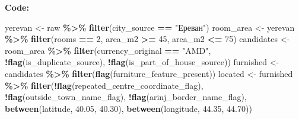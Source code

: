 \documentclass[
]{article}
\newenvironment{Shaded}{\begin{snugshade}}{\end{snugshade}}
\newcommand{\DecValTok}[1]{\textcolor[rgb]{0.00,0.00,0.81}{#1}}
\newcommand{\FloatTok}[1]{\textcolor[rgb]{0.00,0.00,0.81}{#1}}
\newcommand{\FunctionTok}[1]{\textcolor[rgb]{0.13,0.29,0.53}{\textbf{#1}}}
\newcommand{\NormalTok}[1]{#1}
\newcommand{\OtherTok}[1]{\textcolor[rgb]{0.56,0.35,0.01}{#1}}
\newcommand{\SpecialCharTok}[1]{\textcolor[rgb]{0.81,0.36,0.00}{\textbf{#1}}}
\newcommand{\StringTok}[1]{\textcolor[rgb]{0.31,0.60,0.02}{#1}}
\begin{document}
\textbf{Code:}

\begin{Shaded}
\begin{Highlighting}[]
\NormalTok{yerevan }\OtherTok{\textless{}{-}}\NormalTok{ raw }\SpecialCharTok{\%\textgreater{}\%} \FunctionTok{filter}\NormalTok{(city\_source }\SpecialCharTok{==} \StringTok{"Ереван"}\NormalTok{)}
\NormalTok{room\_area }\OtherTok{\textless{}{-}}\NormalTok{ yerevan }\SpecialCharTok{\%\textgreater{}\%} \FunctionTok{filter}\NormalTok{(rooms }\SpecialCharTok{==} \DecValTok{2}\NormalTok{, area\_m2 }\SpecialCharTok{\textgreater{}=} \DecValTok{45}\NormalTok{, area\_m2 }\SpecialCharTok{\textless{}=} \DecValTok{75}\NormalTok{)}
\NormalTok{candidates }\OtherTok{\textless{}{-}}\NormalTok{ room\_area }\SpecialCharTok{\%\textgreater{}\%}
  \FunctionTok{filter}\NormalTok{(currency\_original }\SpecialCharTok{==} \StringTok{"AMD"}\NormalTok{, }\SpecialCharTok{!}\FunctionTok{flag}\NormalTok{(is\_duplicate\_source),}
         \SpecialCharTok{!}\FunctionTok{flag}\NormalTok{(is\_part\_of\_house\_source))}
\NormalTok{furnished }\OtherTok{\textless{}{-}}\NormalTok{ candidates }\SpecialCharTok{\%\textgreater{}\%} \FunctionTok{filter}\NormalTok{(}\FunctionTok{flag}\NormalTok{(furniture\_feature\_present))}
\NormalTok{located }\OtherTok{\textless{}{-}}\NormalTok{ furnished }\SpecialCharTok{\%\textgreater{}\%}
  \FunctionTok{filter}\NormalTok{(}\SpecialCharTok{!}\FunctionTok{flag}\NormalTok{(repeated\_centre\_coordinate\_flag), }\SpecialCharTok{!}\FunctionTok{flag}\NormalTok{(outside\_town\_name\_flag),}
         \SpecialCharTok{!}\FunctionTok{flag}\NormalTok{(arinj\_border\_name\_flag), }\FunctionTok{between}\NormalTok{(latitude, }\FloatTok{40.05}\NormalTok{, }\FloatTok{40.30}\NormalTok{),}
         \FunctionTok{between}\NormalTok{(longitude, }\FloatTok{44.35}\NormalTok{, }\FloatTok{44.70}\NormalTok{))}


\end{Highlighting}
\end{Shaded}
\end{document}
